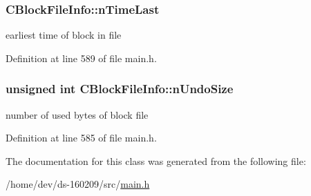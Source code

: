 \hypertarget{class_c_block_file_info_a1d12e4202474bb2f299d18d7d1f28c78}{}
\subsubsection[{n\+Time\+Last}]{ C\+Block\+File\+Info\+::n\+Time\+Last}\label{class_c_block_file_info_a1d12e4202474bb2f299d18d7d1f28c78}


earliest time of block in file 



Definition at line 589 of file main.\+h.

\hypertarget{class_c_block_file_info_ad3e555fd733ef8f38430554c2db5e9d1}{}
\subsubsection[{n\+Undo\+Size}]{\setlength{\rightskip}{0pt plus 5cm}unsigned int C\+Block\+File\+Info\+::n\+Undo\+Size}\label{class_c_block_file_info_ad3e555fd733ef8f38430554c2db5e9d1}


number of used bytes of block file 



Definition at line 585 of file main.\+h.



The documentation for this class was generated from the following file\+:\begin{DoxyCompactItemize}
\item 
/home/dev/ds-\/160209/src/\hyperlink{main_8h}{main.\+h}\end{DoxyCompactItemize}

